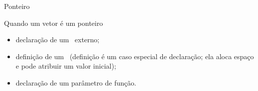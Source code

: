 \begin{frame}{Ponteiro}

Quando um vetor é um ponteiro

\begin{itemize}
\item declaração de um \array\  externo;
\item definição de um \array\ {\scriptsize (definição é um caso
especial de declaração; ela aloca espaço e pode atribuir um valor inicial)};
\item declaração de um parâmetro de função.
\end{itemize}

\end{frame}

